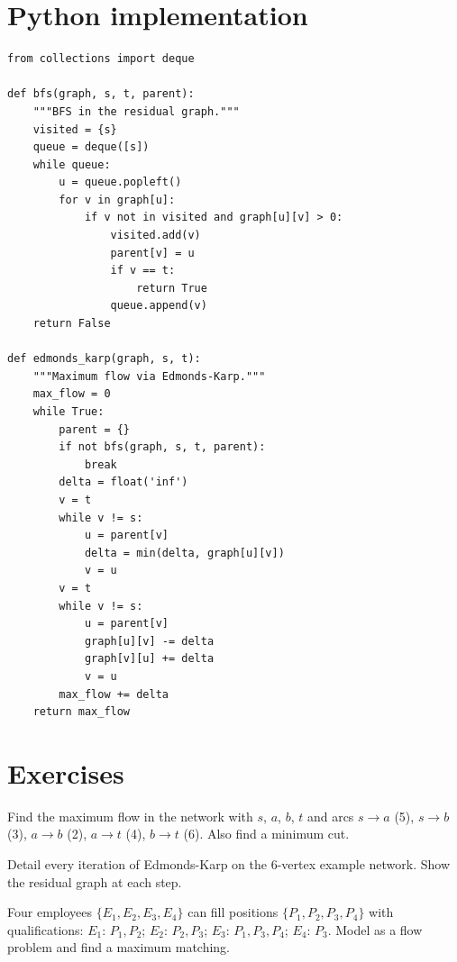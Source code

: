 \section{Python implementation}

\begin{codeblock}[title=\textbf{Edmonds-Karp implementation}]
\begin{verbatim}
from collections import deque

def bfs(graph, s, t, parent):
    """BFS in the residual graph."""
    visited = {s}
    queue = deque([s])
    while queue:
        u = queue.popleft()
        for v in graph[u]:
            if v not in visited and graph[u][v] > 0:
                visited.add(v)
                parent[v] = u
                if v == t:
                    return True
                queue.append(v)
    return False

def edmonds_karp(graph, s, t):
    """Maximum flow via Edmonds-Karp."""
    max_flow = 0
    while True:
        parent = {}
        if not bfs(graph, s, t, parent):
            break
        delta = float('inf')
        v = t
        while v != s:
            u = parent[v]
            delta = min(delta, graph[u][v])
            v = u
        v = t
        while v != s:
            u = parent[v]
            graph[u][v] -= delta
            graph[v][u] += delta
            v = u
        max_flow += delta
    return max_flow
\end{verbatim}
\end{codeblock}

\section{Exercises}

\begin{exercise}
Find the maximum flow in the network with $s$, $a$, $b$, $t$ and arcs
$s \to a$ (5), $s \to b$ (3), $a \to b$ (2), $a \to t$ (4), $b \to t$ (6).
Also find a minimum cut.
\end{exercise}

\begin{exercise}
Detail every iteration of Edmonds-Karp on the 6-vertex example network.
Show the residual graph at each step.
\end{exercise}

\begin{exercise}
Four employees $\{E_1, E_2, E_3, E_4\}$ can fill positions
$\{P_1, P_2, P_3, P_4\}$ with qualifications: $E_1$: $P_1, P_2$;
$E_2$: $P_2, P_3$; $E_3$: $P_1, P_3, P_4$; $E_4$: $P_3$.
Model as a flow problem and find a maximum matching.
\end{exercise}

